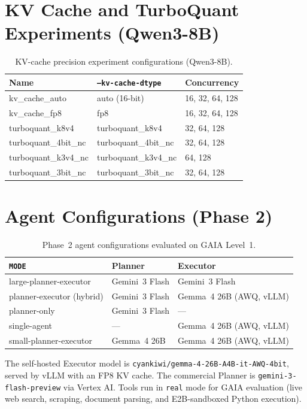 \documentclass[a4paper,12pt]{report}
\begin{document}
\section{KV Cache and TurboQuant Experiments (Qwen3-8B)}

\begin{table}[h!]
\caption{KV-cache precision experiment configurations (Qwen3-8B).}
\centering
\begin{tabular}{|l|l|l|}
\hline
\textbf{Name} & \textbf{\texttt{--kv-cache-dtype}} & \textbf{Concurrency} \\
\hline
kv\_cache\_auto & auto (16-bit) & 16, 32, 64, 128 \\
kv\_cache\_fp8 & fp8 & 16, 32, 64, 128 \\
turboquant\_k8v4 & turboquant\_k8v4 & 32, 64, 128 \\
turboquant\_4bit\_nc & turboquant\_4bit\_nc & 32, 64, 128 \\
turboquant\_k3v4\_nc & turboquant\_k3v4\_nc & 64, 128 \\
turboquant\_3bit\_nc & turboquant\_3bit\_nc & 32, 64, 128 \\
\hline
\end{tabular}
\end{table}

\section{Agent Configurations (Phase 2)}

\begin{table}[h!]
\caption{Phase~2 agent configurations evaluated on GAIA Level~1.}
\centering
\begin{tabular}{|l|l|l|}
\hline
\textbf{\texttt{MODE}} & \textbf{Planner} & \textbf{Executor} \\
\hline
large-planner-executor & Gemini~3 Flash & Gemini~3 Flash \\
planner-executor (hybrid) & Gemini~3 Flash & Gemma~4 26B (AWQ, vLLM) \\
planner-only & Gemini~3 Flash & --- \\
single-agent & --- & Gemma~4 26B (AWQ, vLLM) \\
small-planner-executor & Gemma~4 26B & Gemma~4 26B (AWQ, vLLM) \\
\hline
\end{tabular}
\end{table}

The self-hosted Executor model is \texttt{cyankiwi/gemma-4-26B-A4B-it-AWQ-4bit}, served by vLLM with an FP8 KV cache. The commercial Planner is \texttt{gemini-3-flash-preview} via Vertex AI. Tools run in \texttt{real} mode for GAIA evaluation (live web search, scraping, document parsing, and E2B-sandboxed Python execution).
\end{document}
